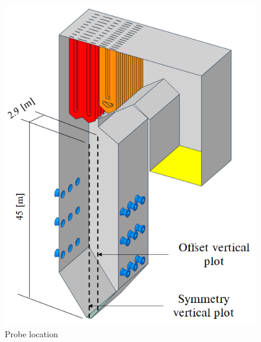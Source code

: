 \documentclass[review]{elsarticle}
\begin{document}
\begin{figure}
\centering
\includegraphics[scale=0.5]{PROBE_LOCATIONS}
\caption{Probe location}
\label{fig_probe_loc}
\end{figure}
\end{document}
